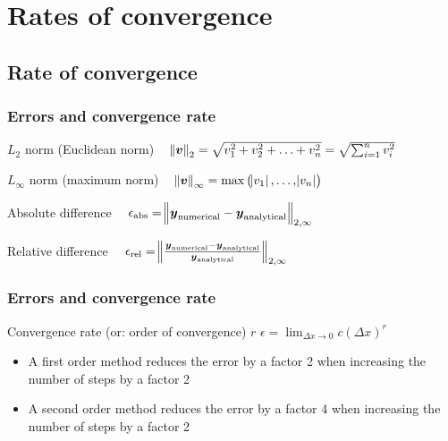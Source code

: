\section{Rates of convergence}
\subsection*{Rate of convergence}
\begin{frame}
  \frametitle{Errors and convergence rate}
  \begin{block}{$L_2$ norm (Euclidean norm)}
    $ \quad \norm{\boldsymbol{v}}_2 = \sqrt{v_1^2+v_2^2+\ldots+v_n^2} = \sqrt{\sum_{i=1}^n v_i^2} $
  \end{block}
  \begin{block}{$L_\infty$ norm (maximum norm)}
    $ \quad \norm{\boldsymbol{v}}_\infty = \text{max}\left( \abs{v_1},\ldots,\abs{v_n}\right) $
  \end{block}
  \begin{block}{Absolute difference}
    $ \quad \epsilon_\text{abs} = \norm{\boldsymbol{y}_\text{numerical} - \boldsymbol{y}_\text{analytical}}_{2,\infty} $
  \end{block}
  \begin{block}{Relative difference}
    $ \quad \epsilon_\text{rel} = \norm{\frac{\boldsymbol{y}_\text{numerical} - \boldsymbol{y}_\text{analytical}}{\boldsymbol{y}_\text{analytical}}}_{2,\infty} $
  \end{block}
\end{frame}

\begin{frame}
  \frametitle{Errors and convergence rate}
  \footnotesize\selectfont
   \begin{block}{Convergence rate (or: order of convergence) $r$}
  $\displaystyle \epsilon = \lim_{\Delta x \rightarrow 0} c(\Delta x)^r $
  \end{block}
  \begin{itemize}
    \item A first order method reduces the error by a factor 2 when increasing the number of steps by a factor 2
    \item A second order method reduces the error by a factor 4 when increasing the number of steps by a factor 2
  \end{itemize}
\end{frame}

